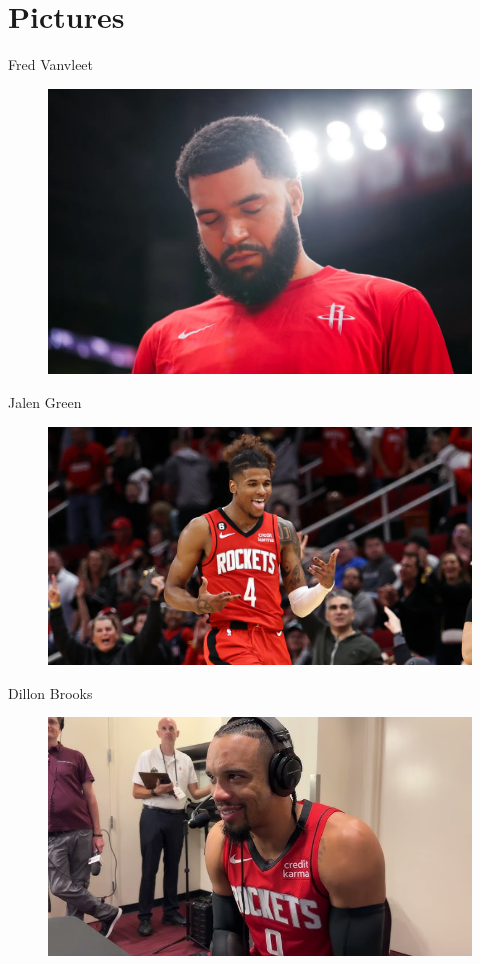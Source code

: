 
\section{Pictures}

\begin{frame}{Fred Vanvleet}
    \begin{figure}[h]
        \includegraphics[width=0.8\linewidth]{images/freddy.png}
        \label{fig:Team}
    \end{figure}
\end{frame}
\begin{frame}{Jalen Green}
    \begin{figure}[h]
        \includegraphics[width=0.8\linewidth]{images/jalen.jpg}
        \label{fig:Team}
    \end{figure}
\end{frame}
\begin{frame}{Dillon Brooks}
    \begin{figure}[h]
        \includegraphics[width=0.8\linewidth]{images/dillon.jpg}
        \label{fig:Team}
    \end{figure}
\end{frame}
